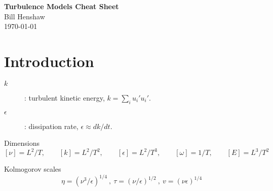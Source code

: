 \documentclass{article}
\begin{document}


\def\ud     {{    U}}
\def\pd     {{    P}}

\newcommand{\mbar}{\bar{m}}
\newcommand{\Rbar}{\bar{R}}
\newcommand{\Ru}{R_u}         %
\newcommand{\Div}{\grad\cdot}
\newcommand{\tauv}{\boldsymbol{\tau}}
\newcommand{\sumi}{\sum_{i=1}^n}
\newcommand{\dt}{{\Delta t}}

\vspace{5\baselineskip}
\begin{flushleft}
{\bf\Large
Turbulence Models Cheat Sheet\\
}
\vspace{2\baselineskip}
Bill Henshaw  \\
\today\\
\vspace{\baselineskip}

\end{flushleft}



\section{Introduction}

\newcommand{\eps}{\epsilon}

\begin{description}
  \item[$k$] : turbulent kinetic energy, $k=\sum_i u_i' u_i'$.
  \item[$\eps$] : dissipation rate, $\eps \approx dk/dt$.
\end{description}

Dimensions
\[
  [ \nu ] = L^2/T , \qquad [k] = L^2/T^2,  \qquad [\eps ] = L^2/T^3, \qquad [\omega]= 1/T ,
  \qquad [E] = L^3/T^2
\]

Kolmogorov scales
\[
   \eta = (\nu^3/\eps)^{1/4} ~,~ \tau = (\nu/\eps)^{1/2} ~,~ v=(\nu\eps)^{1/4}
\]
\end{document}
